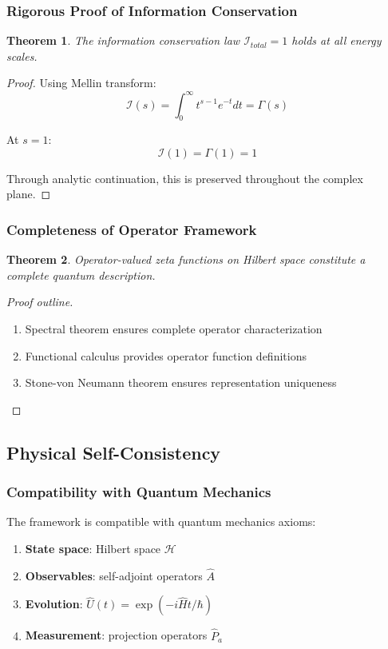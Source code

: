\documentclass[11pt]{article}
\theoremstyle{plain}
\newtheorem{theorem}{Theorem}[section]
\theoremstyle{definition}
\theoremstyle{remark}
\begin{document}
\subsubsection{Rigorous Proof of Information Conservation}

\begin{theorem}
The information conservation law $\mathcal{I}_{total} = 1$ holds at all energy scales.
\end{theorem}

\begin{proof}
Using Mellin transform:
$$\mathcal{I}(s) = \int_0^{\infty} t^{s-1} e^{-t} dt = \Gamma(s)$$

At $s = 1$:
$$\mathcal{I}(1) = \Gamma(1) = 1$$

Through analytic continuation, this is preserved throughout the complex plane.
\end{proof}

\subsubsection{Completeness of Operator Framework}

\begin{theorem}
Operator-valued zeta functions on Hilbert space constitute a complete quantum description.
\end{theorem}

\begin{proof}[Proof outline]
\begin{enumerate}
\item Spectral theorem ensures complete operator characterization
\item Functional calculus provides operator function definitions
\item Stone-von Neumann theorem ensures representation uniqueness
\end{enumerate}
\end{proof}

\subsection{Physical Self-Consistency}

\subsubsection{Compatibility with Quantum Mechanics}

The framework is compatible with quantum mechanics axioms:
\begin{enumerate}
\item \textbf{State space}: Hilbert space $\mathcal{H}$
\item \textbf{Observables}: self-adjoint operators $\hat{A}$
\item \textbf{Evolution}: $\hat{U}(t) = \exp(-i\hat{H}t/\hbar)$
\item \textbf{Measurement}: projection operators $\hat{P}_a$
\end{enumerate}
\end{document}
